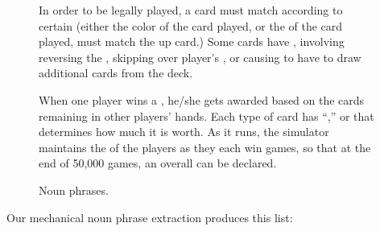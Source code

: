 \begin{figure}
{{\vspace{.1in}

\textsf{In order to be legally played, a card must match according to certain
 (either the color of the card played, or the  of
the card played, must match the up card.) Some cards have , involving reversing the , skipping over
player's , or causing  to have to
draw additional cards from the deck.}

\vspace{.1in}

\textsf{When one player wins a , he/she gets awarded
 based on the cards remaining in other players' hands. Each
type of card has ``,'' or  that
determines how much it is worth. As it runs, the simulator maintains the
 of the players as they each win games, so that at
the end of 50,000 games, an overall  can be declared.} }}

\vspace{.1in}
\caption{Noun phrases.}
\label{fig:unoNouns}
\end{figure}

Our mechanical noun phrase extraction produces this list:


